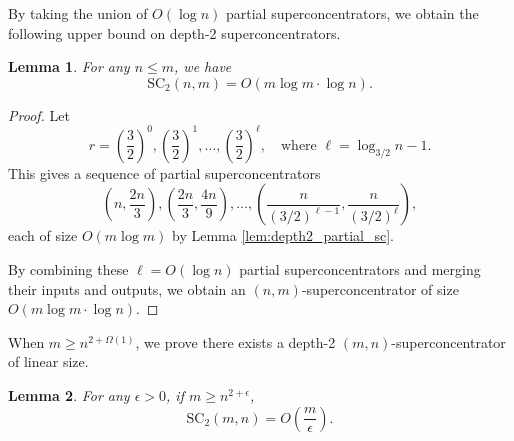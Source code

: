 \documentclass[11pt]{article}
\newtheorem{lemma}{Lemma}
\newcommand{\scsize}{\mathrm{SC}}
\begin{document}
By taking the union of $O(\log n)$ partial superconcentrators, we obtain the following upper bound on depth-2 superconcentrators.

\begin{lemma}
\label{lem:sc_depth2_size}
For any $n \le m$, we have
\[
\scsize_2(n, m) = O(m \log m \cdot \log n).
\]
\end{lemma}

\begin{proof} 
Let
\[
r = \left(\frac{3}{2}\right)^0, \left(\frac{3}{2}\right)^1, \ldots, \left(\frac{3}{2}\right)^{\ell}, \quad \text{where } \ell = \log_{3/2} n - 1.
\]
This gives a sequence of partial superconcentrators
\[
\left(n, \frac{2n}{3}\right), \left(\frac{2n}{3}, \frac{4n}{9}\right), \ldots, \left(\frac{n}{(3/2)^{\ell-1}}, \frac{n}{(3/2)^{\ell}}\right),
\]
each of size $O(m \log m)$ by Lemma \ref{lem:depth2_partial_sc}.

By combining these $\ell = O(\log n)$ partial superconcentrators and merging their inputs and outputs, we obtain an $(n, m)$-superconcentrator of size $O(m \log m \cdot \log n)$.
\end{proof}


When $m \ge n^{2+\Omega(1)}$, we prove there exists a depth-2 $(m, n)$-superconcentrator of linear size.

\begin{lemma}
\label{lem:sc_depth2_linear_size}
For any $\epsilon > 0$, if $m \ge n^{2+\epsilon}$,
\[
\scsize_2(m, n) = O\left(\frac{m}{\epsilon}\right).
\]
\end{lemma}
\end{document}
